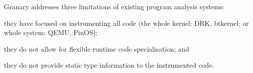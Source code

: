 \documentclass[preprint]{sigplanconf}
\begin{document}


Granary addresses three limitations of existing program analysis systems: \begin{inparaenum}[i)]
	\item they have focused on instrumenting all code (the whole kernel: DRK, btkernel; or whole system: QEMU, PinOS);
	\item they do not allow for flexible runtime code specialisation; and
	\item they do not provide static type information to the instrumented code.
\end{inparaenum} 
\end{document}
